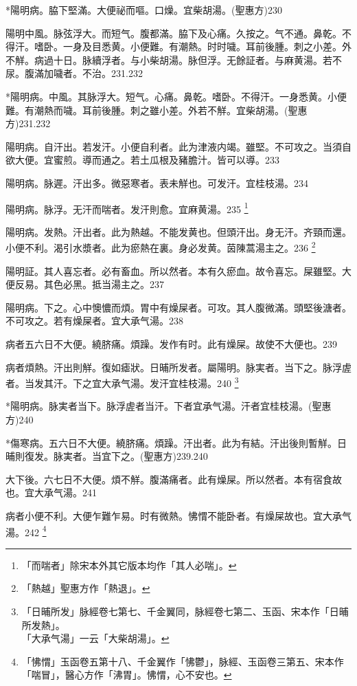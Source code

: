 \documentclass[12pt,twoside,UTF8,b5paper]{ctexbook}
\begin{document}
*陽明病。脇下堅滿。大便祕而嘔。口燥。宜柴胡湯。(聖惠方)230

陽明中風。脉弦浮大。而短气。腹都滿。脇下及心痛。久按之。气不通。鼻乾。不得汗。嗜卧。一身及目悉黄。小便難。有潮熱。时时噦。耳前後腫。刺之小差。外不觧。病過十日。脉續浮者。与{小}柴胡湯。脉但浮。无餘証者。与麻黄湯。若不尿。腹滿加噦者。不治。231.232

*陽明病。中風。其脉浮大。短气。心痛。鼻乾。嗜卧。不得汗。一身悉黄。小便難。有潮熱而噦。耳前後腫。刺之雖小差。外若不觧。宜柴胡湯。(聖惠方)231.232

陽明病。自汗出。若发汗。小便自利者。此为{津液}内竭。雖堅。不可攻之。当須自欲大便。宜蜜煎。導而通之。若土瓜根及豬膽汁。皆可以導。233

陽明病。脉遲。汗出多。微惡寒者。表未觧也。可发汗。宜桂枝湯。234

陽明病。脉浮。无汗而喘者。发汗則愈。宜麻黄湯。235
	\footnote{「而喘者」除宋本外其它版本均作「其人必喘」。}

陽明病。发熱。汗出者。此为熱越。不能发黄也。但頭汗出。身无汗。齐頸而還。小便不利。渴引水漿者。此为瘀熱在裏。身必发黄。茵陳{蒿}湯主之。236
	\footnote{「熱越」聖惠方作「熱退」。}

陽明証。其人喜忘者。必有畜血。所以然者。本有久瘀血。故令喜忘。屎雖堅。大便反易。其色必黑。抵当湯主之。237

陽明病。下之。心中懊憹而煩。胃中有燥屎者。可攻。其人腹微滿。頭堅後溏者。不可攻之。若有燥屎者。宜{大}承气湯。238

病者五六日不大便。繞脐痛。煩躁。发作有时。此有燥屎。故使不大便也。239

病者煩熱。汗出則觧。復如瘧狀。日晡所发者。屬陽明。脉実者。当下之。脉浮虗者。当发其汗。下之宜{大}承气湯。发汗宜桂枝湯。240
	\footnote{「日晡所发」脉經卷七第七、千金翼同，脉經卷七第二、玉函、宋本作「日晡所发熱」。\\「大承气湯」一云「大柴胡湯」。}

*陽明病。脉実者当下。脉浮虗者当汗。下者宜承气湯。汗者宜桂枝湯。(聖惠方)240

*傷寒病。五六日不大便。繞脐痛。煩躁。汗出者。此为有結。汗出後則暫觧。日晡則復发。脉実者。当宜下之。(聖惠方)239.240

大下後。六七日不大便。煩不觧。腹滿痛者。此有燥屎。所以然者。本有宿食故也。宜{大}承气湯。241

病者小便不利。大便乍難乍易。时有微熱。怫㥜不能卧者。有燥屎故也。宜{大}承气湯。242
	\footnote{「怫㥜」玉函卷五第十八、千金翼作「怫鬱」，脉經、玉函卷三第五、宋本作「喘冒」，醫心方作「沸胃」。怫㥜，心不安也。}
\end{document}
